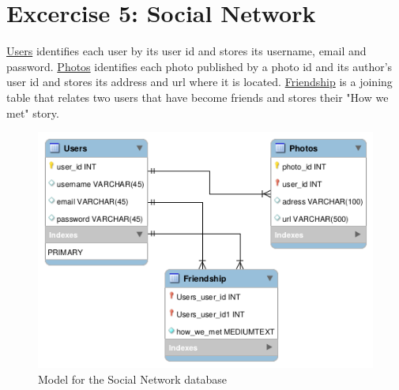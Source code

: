 \documentclass{article}
\begin{document}
\section{Excercise 5: Social Network}
\underline{Users} identifies each user by its user id and stores its username, email and password. \underline{Photos} identifies each photo published by a photo id and its author's user id and stores its address and url where it is located. \underline{Friendship} is a joining table that relates two users that have become friends and stores their "How we met" story.
\begin{figure}[h!]
 \centering
  \includegraphics[width=0.8\linewidth]{xarxa.png}
  \caption{Model for the Social Network database}
  \label{fig:Social Network DB}
\end{figure}
\end{document}

